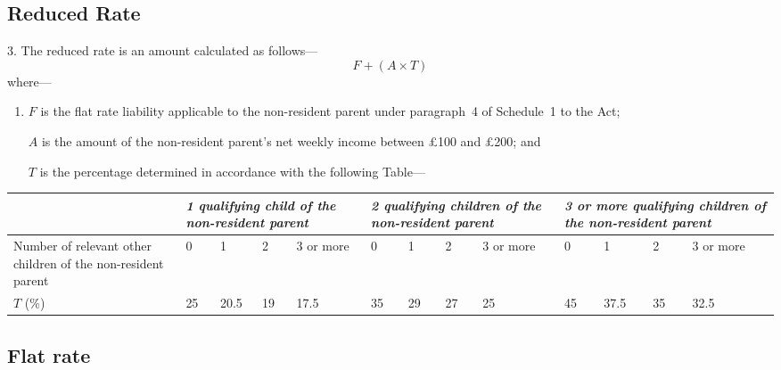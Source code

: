 \documentclass[12pt,a4paper]{article}
\begin{document}
\subsection[3. Reduced Rate]{Reduced Rate}

3.  The reduced rate is an amount calculated as follows—
\[F + (A \times T)\]
where—
\begin{enumerate}\item[]
    $F$ is the flat rate liability applicable to the non-resident parent under paragraph~4 of Schedule~1 to the Act;

    $A$ is the amount of the non-resident parent’s net weekly income between £100 and £200; and

    $T$ is the percentage determined in accordance with the following Table— 
\end{enumerate}

{\scriptsize\noindent{}
\begin{tabular}{p{79pt}p{10pt}p{17pt}p{8pt}p{18pt}p{10pt}p{10pt}p{9pt}p{18pt}p{10pt}p{17pt}p{10pt}p{18pt}}
\hline
&	\multicolumn{4}{p{84pt}}{\itshape 1 qualifying child of the non-resident parent}	& \multicolumn{4}{p{78pt}}{\itshape 2 qualifying children of the non-resident parent}	& \multicolumn{4}{p{84pt}}{\itshape 3 or more qualifying children of the non-resident parent}\\
\hline
Number of relevant other children of the non-resident parent	&0	&1	&2	&3 or more	&0	&1	&2	&3 or more	&0	&1	&2	&3 or more\\
\hline
$T$ (\%)	&25	&20$.$5	&19	&17$.$5	&35	&29	&27	&25	&45	&37$.$5	&35	&32$.$5\\
\hline
\end{tabular}

}

\subsection[4. Flat rate]{Flat rate}
\end{document}

